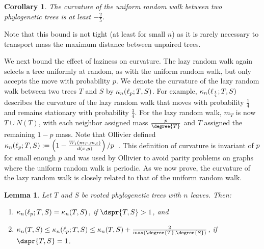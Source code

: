 \documentclass{amsart}
\newtheorem{lemma}[theorem]{Lemma}
\newtheorem{corollary}[theorem]{Corollary}
\newcommand{\curvature}[2][]{%
    \ifthenelse{\equal{#1}{}}%
		{\kappa_n(#2)}%
		{\kappa_n(#1;#2)}%
}
\begin{document}
\begin{corollary}
	The curvature of the uniform random walk between two phylogenetic trees is at least $-\frac{2}{5}$.
\end{corollary}

Note that this bound is not tight (at least for small $n$) as it is rarely necessary to transport mass the maximum distance between unpaired trees.

We next bound the effect of laziness on curvature.
The lazy random walk again selects a tree uniformly at random, as with the uniform random walk, but only accepts the move with probability $p$.
We denote the curvature of the lazy random walk between two trees $T$ and $S$ by $\curvature[\ell_p]{T,S}$.
For example, $\curvature[\ell_{\frac{1}{4}}]{T,S}$ describes the curvature of the lazy random walk that moves with probability $\frac{1}{4}$ and remains stationary with probability $\frac{3}{4}$.
For the lazy random walk, $m_T$ is now $T \cup N(T)$, with each neighbor assigned mass $\frac{p}{\degree{T}}$ and $T$ assigned the remaining $1 - p$ mass.
Note that Ollivier defined $\curvature[\ell_p]{T, S} := \left(1 - \frac{W_1(m_T, m_S)}{d(x, y)}\right) / p$~\cite{Ollivier2009-bw}.
This definition of curvature is invariant of $p$ for small enough $p$ and was used by Ollivier to avoid parity problems on graphs where the uniform random walk is periodic.
As we now prove, the curvature of the lazy random walk is closely related to that of the uniform random walk.

\begin{lemma}
	Let $T$ and $S$ be rooted phylogenetic trees with $n$ leaves.
	Then:
	\begin{enumerate}
		\item	$\curvature[\ell_p]{T,S} = \curvature{T,S}$, if $\dspr{T,S} > 1$, and
		\item	$\curvature{T,S} \le \curvature[\ell_p]{T,S} \le \curvature{T,S} + \frac{2}{\max(\degree{T}, \degree{S})}$, if $\dspr{T,S} = 1$.
	\end{enumerate}
\end{lemma}
\end{document}
